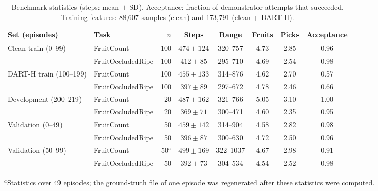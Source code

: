 \begin{table}[t]
\centering
\caption{Benchmark statistics (steps: mean $\pm$ SD). Acceptance: fraction of demonstrator attempts that succeeded. Training features: 88,607 samples (clean) and 173,791 (clean + DART-H).}
\label{tab:dataset}
\footnotesize
\begin{adjustbox}{max width=\textwidth}\begin{tabular}{llrccccc}
\toprule
Set (episodes) & Task & $n$ & Steps & Range & Fruits & Picks & Acceptance\\
\midrule
Clean train (0--99) & FruitCount & 100 & $474\pm124$ & 320--757 & 4.73 & 2.85 & 0.96\\
 & FruitOccludedRipe & 100 & $412\pm85$ & 295--710 & 4.69 & 2.54 & 0.98\\
DART-H train (100--199) & FruitCount & 100 & $455\pm133$ & 314--876 & 4.62 & 2.70 & 0.57\\
 & FruitOccludedRipe & 100 & $397\pm89$ & 297--672 & 4.78 & 2.46 & 0.66\\
Development (200--219) & FruitCount & 20 & $487\pm162$ & 321--766 & 5.05 & 3.10 & 1.00\\
 & FruitOccludedRipe & 20 & $369\pm71$ & 300--471 & 4.60 & 2.35 & 0.95\\
Validation (0--49) & FruitCount & 50 & $459\pm142$ & 314--904 & 4.58 & 2.82 & 0.98\\
 & FruitOccludedRipe & 50 & $396\pm87$ & 300--630 & 4.72 & 2.50 & 0.96\\
Validation (50--99) & FruitCount & 50$^{a}$ & $499\pm169$ & 322--1037 & 4.67 & 2.98 & 0.91\\
 & FruitOccludedRipe & 50 & $392\pm73$ & 304--534 & 4.54 & 2.52 & 0.98\\
\bottomrule
\end{tabular}\end{adjustbox}

\footnotesize $^{a}$Statistics over 49 episodes; the ground-truth file of one episode was regenerated after these statistics were computed.
\end{table}
